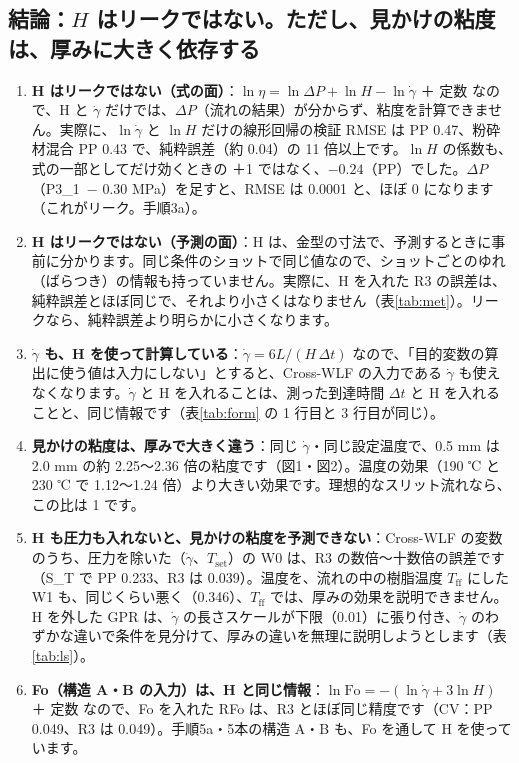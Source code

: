 \documentclass[paper=a4paper,fontsize=10.5pt,line_length=44zw,number_of_lines=38]{jlreq}
\newcommand{\gd}{\dot{\gamma}}
\newcommand{\Tff}{T_{\mathrm{ff}}}
\newcommand{\Tset}{T_{\mathrm{set}}}
\newcommand{\PI}{P3\_1}
\begin{document}
\subsection{結論：$H$ はリークではない。ただし、見かけの粘度は、厚みに大きく依存する}
\begin{enumerate}[itemsep=0.6ex,topsep=0.6ex]
\item \textbf{H はリークではない（式の面）}：$\ln\eta = \ln\Delta P + \ln H - \ln\gd$ ＋ 定数 なので、H と $\gd$ だけでは、$\Delta P$（流れの結果）が分からず、粘度を計算できません。実際に、$\ln\gd$ と $\ln H$ だけの線形回帰の検証 RMSE は PP 0.47、粉砕材混合 PP 0.43 で、純粋誤差（約 0.04）の 11 倍以上です。$\ln H$ の係数も、式の一部としてだけ効くときの ＋1 ではなく、$-0.24$（PP）でした。$\Delta P$（\PI\ $-$ 0.30 MPa）を足すと、RMSE は 0.0001 と、ほぼ 0 になります（これがリーク。手順3a）。
\item \textbf{H はリークではない（予測の面）}：H は、金型の寸法で、予測するときに事前に分かります。同じ条件のショットで同じ値なので、ショットごとのゆれ（ばらつき）の情報も持っていません。実際に、H を入れた R3 の誤差は、純粋誤差とほぼ同じで、それより小さくはなりません（表\ref{tab:met}）。リークなら、純粋誤差より明らかに小さくなります。
\item \textbf{$\gd$ も、H を使って計算している}：$\gd = 6L/(H\,\Delta t)$ なので、「目的変数の算出に使う値は入力にしない」とすると、Cross-WLF の入力である $\gd$ も使えなくなります。$\gd$ と H を入れることは、測った到達時間 $\Delta t$ と H を入れることと、同じ情報です（表\ref{tab:form} の 1 行目と 3 行目が同じ）。
\item \textbf{見かけの粘度は、厚みで大きく違う}：同じ $\gd$・同じ設定温度で、0.5 mm は 2.0 mm の約 2.25〜2.36 倍の粘度です（図1・図2）。温度の効果（190 ℃ と 230 ℃ で 1.12〜1.24 倍）より大きい効果です。理想的なスリット流れなら、この比は 1 です。
\item \textbf{H も圧力も入れないと、見かけの粘度を予測できない}：Cross-WLF の変数のうち、圧力を除いた（$\gd$、$\Tset$）の W0 は、R3 の数倍〜十数倍の誤差です（S\_T で PP 0.233、R3 は 0.039）。温度を、流れの中の樹脂温度 $\Tff$ にした W1 も、同じくらい悪く（0.346）、$\Tff$ では、厚みの効果を説明できません。H を外した GPR は、$\gd$ の長さスケールが下限（0.01）に張り付き、$\gd$ のわずかな違いで条件を見分けて、厚みの違いを無理に説明しようとします（表\ref{tab:ls}）。
\item \textbf{Fo（構造 A・B の入力）は、H と同じ情報}：$\ln\mathrm{Fo} = -(\ln\gd + 3\ln H)$ ＋ 定数 なので、Fo を入れた RFo は、R3 とほぼ同じ精度です（CV：PP 0.049、R3 は 0.049）。手順5a・5本の構造 A・B も、Fo を通して H を使っています。

\end{enumerate}
\end{document}
